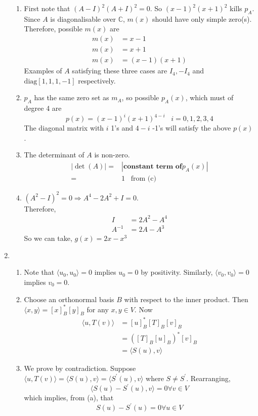\documentclass[12pt]{article}
\newcommand{\diag}{\mathrm{diag}}
\newcommand{\inv}{^{-1}}
\theoremstyle{definition}
\begin{document}
\begin{enumerate}
\begin{enumerate}
\item First note that $(A-I)^2(A+I)^2 = 0$. So $(x-1)^2(x+1)^2$ kills $p_A$.
Since $A$ is diagonalisable over $\mathbb{C}$, $m(x)$ should have only simple zero(s). Therefore, possible $m(x)$ are
\begin{align*}
m(x) &= x-1\\
m(x)&=x+1\\
m(x)&=(x-1)(x+1)
\end{align*}
Examples of $A$ satisfying these three cases are $I_4,-I_4$ and $\diag[1,1,1,-1]$ respectively.
\item $p_A$ has the same zero set as $m_A$, so possible $p_A(x)$, which must of degree 4 are
\[
p(x)=(x-1)^i(x+1)^{4-i}\;\;\;i=0,1,2,3,4
\]
The diagonal matrix with $i$ 1's and $4-i$ -1's will satisfy the above $p(x)$.
\item The determinant of $A$ is non-zero.
\begin{align*}
|\det(A)|=&|\textbf{constant term of} p_A(x)|\\
=&1\;\;\;\text{from (c)}
\end{align*}
\item $(A^2-I)^2=0\Rightarrow A^4-2A^2+I=0$.\\Therefore,
\begin{align*}
I &= 2A^2-A^4\\
A\inv &= 2A-A^3
\end{align*}
So we can take, $g(x)=2x-x^3$
\end{enumerate}
\item \begin{enumerate}
\item Note that $\langle u_0,u_0\rangle = 0$ implies $u_0 = 0$ by positivity. Similarly, $\langle v_0,v_0\rangle = 0$ implies $v_0 = 0$.
\item Choose an orthonormal basis $B$ with respect to the inner product. Then $\langle x,y\rangle = [x]_B^\ast [y]_B$ for any $x,y \in V$. Now
\begin{align*}
\langle u,T(v)\rangle &=[u]_B^\ast [T]_B[v]_B\\
&=([T]_B [u]_B)^\ast [v]_B\\
&=\langle S(u),v\rangle
\end{align*}
\item We prove by contradiction. Suppose $\langle u,T(v)\rangle = \langle S(u),v\rangle = \langle S^\prime(u),v\rangle$ where $S\neq S^\prime$. Rearranging, 
\[
\langle S(u)-S^\prime(u),v\rangle = 0 \forall v\in V
\]
which implies, from (a), that
\[
S(u)-S^\prime (u)=0\forall u\in V
\]
\end{enumerate}
\end{enumerate}
\end{document}

